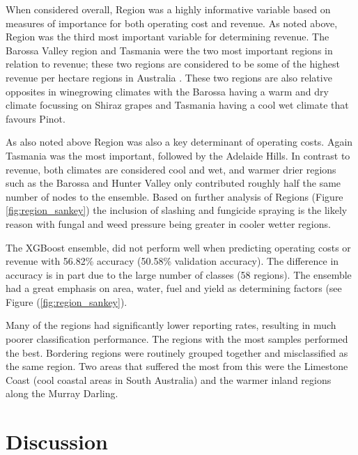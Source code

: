 \documentclass[review,12pt,authoryear]{elsarticle}
\begin{document}
\begin{linenumbers}
When considered overall, Region was a highly informative variable based on measures of importance for both operating cost and revenue. As noted above, Region was the third most important variable for determining revenue. The Barossa Valley region and Tasmania were the two most important regions in relation to revenue; these two regions are considered to be some of the highest revenue per hectare regions in Australia \citep{wineaustraliaNationalVintageReport2022}. These two regions are also relative opposites in winegrowing climates with the Barossa having a warm and dry climate focussing on Shiraz grapes and Tasmania having a cool wet climate that favours Pinot. 
\par
As also noted above Region was also a key determinant of operating costs. Again Tasmania was the most important, followed by the Adelaide Hills. In contrast to revenue, both climates are considered cool and wet, and warmer drier regions such as the Barossa and Hunter Valley only contributed roughly half the same number of nodes to the ensemble. Based on further analysis of Regions (Figure \ref{fig:region_sankey}) the inclusion of slashing and fungicide spraying is the likely reason with fungal and weed pressure being greater in cooler wetter regions.
\par
The XGBoost ensemble, did not perform well when predicting operating costs or revenue with 56.82\% accuracy (50.58\% validation accuracy). The difference in accuracy is in part due to the large number of classes (58 regions). The ensemble had a great emphasis on area, water, fuel and yield as determining factors (see Figure (\ref{fig:region_sankey}). 
\par
Many of the regions had significantly lower reporting rates, resulting in much poorer classification performance. The regions with the most samples performed the best. Bordering regions were routinely grouped together and misclassified as the same region. Two areas that suffered the most from this were the Limestone Coast (cool coastal areas in South Australia) and the warmer inland regions along the Murray Darling.


\section{Discussion}


\end{linenumbers}
\end{document}
